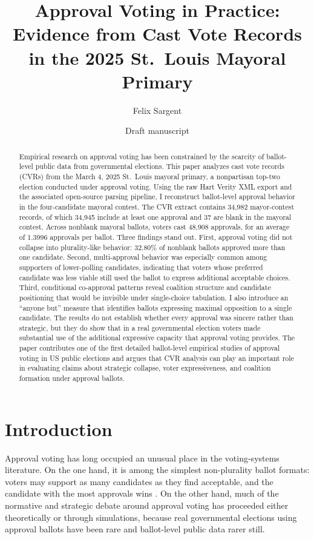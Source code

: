 \documentclass[11pt]{article}
\title{Approval Voting in Practice: Evidence from Cast Vote Records in the 2025 St.~Louis Mayoral Primary}
\author{Felix Sargent}
\date{Draft manuscript}
\begin{document}
\maketitle

\begin{abstract}
Empirical research on approval voting has been constrained by the scarcity of ballot-level public data from governmental elections. This paper analyzes cast vote records (CVRs) from the March 4, 2025 St.~Louis mayoral primary, a nonpartisan top-two election conducted under approval voting. Using the raw Hart Verity XML export and the associated open-source parsing pipeline, I reconstruct ballot-level approval behavior in the four-candidate mayoral contest. The CVR extract contains 34,982 mayor-contest records, of which 34,945 include at least one approval and 37 are blank in the mayoral contest. Across nonblank mayoral ballots, voters cast 48,908 approvals, for an average of 1.3996 approvals per ballot. Three findings stand out. First, approval voting did not collapse into plurality-like behavior: 32.80\% of nonblank ballots approved more than one candidate. Second, multi-approval behavior was especially common among supporters of lower-polling candidates, indicating that voters whose preferred candidate was less viable still used the ballot to express additional acceptable choices. Third, conditional co-approval patterns reveal coalition structure and candidate positioning that would be invisible under single-choice tabulation. I also introduce an ``anyone but'' measure that identifies ballots expressing maximal opposition to a single candidate. The results do not establish whether every approval was sincere rather than strategic, but they do show that in a real governmental election voters made substantial use of the additional expressive capacity that approval voting provides. The paper contributes one of the first detailed ballot-level empirical studies of approval voting in US public elections and argues that CVR analysis can play an important role in evaluating claims about strategic collapse, voter expressiveness, and coalition formation under approval ballots.
\end{abstract}

\section{Introduction}
Approval voting has long occupied an unusual place in the voting-systems literature. On the one hand, it is among the simplest non-plurality ballot formats: voters may support as many candidates as they find acceptable, and the candidate with the most approvals wins \citep{brams2007approval}. On the other hand, much of the normative and strategic debate around approval voting has proceeded either theoretically or through simulations, because real governmental elections using approval ballots have been rare and ballot-level public data rarer still.
\end{document}
